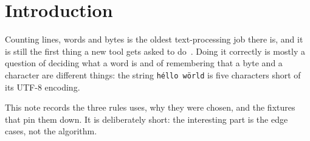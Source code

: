 \section{Introduction}
\label{sec:introduction}

Counting lines, words and bytes is the oldest text-processing job there is, and it is
still the first thing a new tool gets asked to do~\cite{knuth1984}. Doing it correctly
is mostly a question of deciding what a word is and of remembering that a byte and a
character are different things: the string \texttt{h\'ello w\"orld} is five characters
short of its UTF-8 encoding.

This note records the three rules \projectname{} uses, why they were chosen, and the
fixtures that pin them down. It is deliberately short: the interesting part is the
edge cases, not the algorithm.
